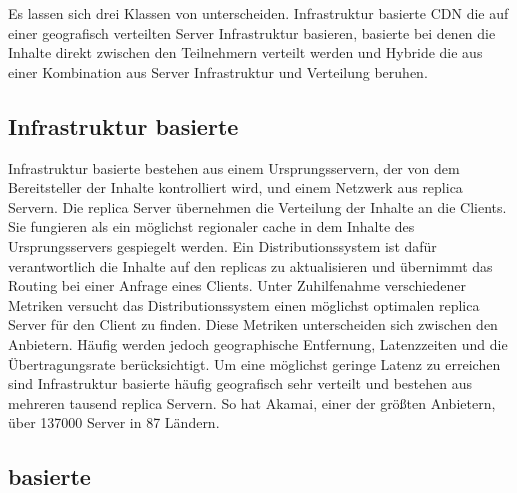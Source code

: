 Es lassen sich drei Klassen von \cdns unterscheiden. Infrastruktur basierte CDN die auf einer geografisch verteilten Server Infrastruktur basieren, \pTp basierte \cdns bei denen die Inhalte direkt zwischen den Teilnehmern verteilt werden und Hybride \cdns die aus einer Kombination aus Server Infrastruktur und \pTp Verteilung beruhen.

\subsection{Infrastruktur basierte \cdns}
Infrastruktur basierte \cdns bestehen aus einem Ursprungsservern, der von dem Bereitsteller der Inhalte kontrolliert wird, und einem Netzwerk aus replica Servern. Die replica Server übernehmen die Verteilung der Inhalte an die Clients. Sie fungieren als ein möglichst regionaler cache in dem Inhalte des Ursprungsservers gespiegelt werden. Ein Distributionssystem ist dafür verantwortlich die Inhalte auf den replicas zu aktualisieren und übernimmt das Routing bei einer Anfrage eines Clients. Unter Zuhilfenahme verschiedener Metriken versucht das Distributionssystem einen möglichst optimalen replica Server für den Client zu finden. Diese Metriken unterscheiden sich zwischen den Anbietern. Häufig werden jedoch geographische Entfernung, Latenzzeiten und die Übertragungsrate berücksichtigt. Um eine möglichst geringe Latenz zu erreichen sind Infrastruktur basierte \cdns häufig geografisch sehr verteilt und bestehen aus mehreren tausend replica Servern. So hat Akamai, einer der größten \cdn Anbietern, über 137000 Server in 87 Ländern. \cite{akamaiPeer} 


\subsection{\pTp basierte \cdns }



%
%

